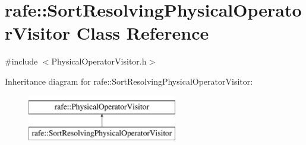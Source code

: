 \hypertarget{classrafe_1_1_sort_resolving_physical_operator_visitor}{\section{rafe\+:\+:Sort\+Resolving\+Physical\+Operator\+Visitor Class Reference}
\label{classrafe_1_1_sort_resolving_physical_operator_visitor}
}


{\ttfamily \#include $<$Physical\+Operator\+Visitor.\+h$>$}

Inheritance diagram for rafe\+:\+:Sort\+Resolving\+Physical\+Operator\+Visitor\+:\begin{figure}[H]
\begin{center}
\leavevmode
\includegraphics[height=2.000000cm]{classrafe_1_1_sort_resolving_physical_operator_visitor}
\end{center}
\end{figure}
